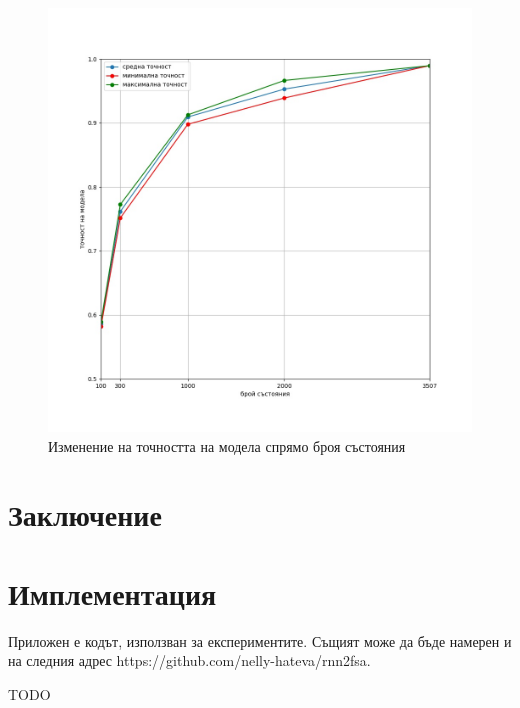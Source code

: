 \documentclass[a4paper,12pt]{article}
\begin{document}
\begin{figure}[H]
  \centering
  \includegraphics[width=\textwidth,height=\textheight,keepaspectratio]{figures/number-of-states-accuracy.jpg}
  \caption{Изменение на точността на модела спрямо броя състояния}
\end{figure}

\pagebreak

\section{Заключение}

\section{Имплементация}

Приложен е кодът, използван за експериментите. Същият може да бъде намерен и на следния адрес https://github.com/nelly-hateva/rnn2fsa.

TODO

\pagebreak
\end{document}
